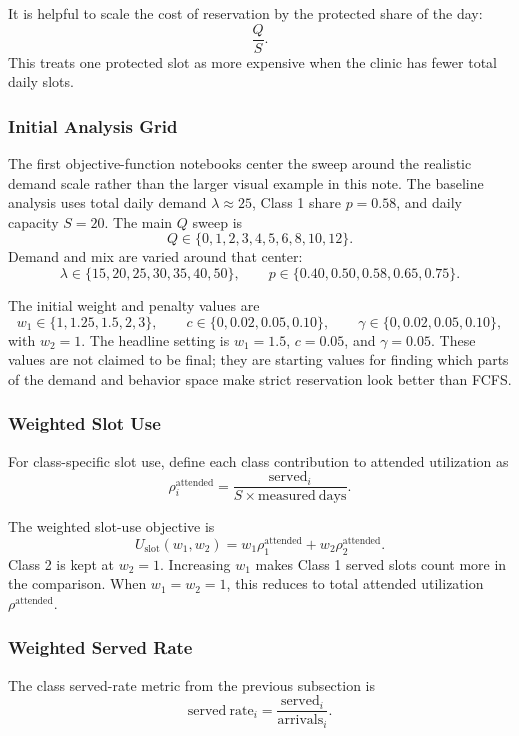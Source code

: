 \documentclass[11pt]{article}
\begin{document}
It is helpful to scale the cost of reservation by the protected share of the day:
\[
\frac{Q}{S}.
\]
This treats one protected slot as more expensive when the clinic has fewer total daily slots.

\subsubsection{Initial Analysis Grid}

The first objective-function notebooks center the sweep around the realistic demand scale rather
than the larger visual example in this note. The baseline analysis uses total daily demand
\(\lambda\approx 25\), Class 1 share \(p=0.58\), and daily capacity \(S=20\). The main \(Q\) sweep is
\[
Q\in\{0,1,2,3,4,5,6,8,10,12\}.
\]
Demand and mix are varied around that center:
\[
\lambda\in\{15,20,25,30,35,40,50\},
\qquad
p\in\{0.40,0.50,0.58,0.65,0.75\}.
\]

The initial weight and penalty values are
\[
w_1\in\{1,1.25,1.5,2,3\},
\qquad
c\in\{0,0.02,0.05,0.10\},
\qquad
\gamma\in\{0,0.02,0.05,0.10\},
\]
with \(w_2=1\). The headline setting is \(w_1=1.5\), \(c=0.05\), and
\(\gamma=0.05\). These values are not claimed to be final; they are starting values for finding
which parts of the demand and behavior space make strict reservation look better than FCFS.

\subsubsection{Weighted Slot Use}

For class-specific slot use, define each class contribution to attended utilization as
\[
\rho_i^{\mathrm{attended}}
=
\frac{\mathrm{served}_i}{S\times\mathrm{measured\ days}}.
\]

The weighted slot-use objective is
\[
U_{\mathrm{slot}}(w_1,w_2)
=
w_1\rho_1^{\mathrm{attended}}
+
w_2\rho_2^{\mathrm{attended}}.
\]
Class 2 is kept at \(w_2=1\). Increasing \(w_1\) makes Class 1 served slots count more in the
comparison. When \(w_1=w_2=1\), this reduces to total attended utilization
\(\rho^{\mathrm{attended}}\).

\subsubsection{Weighted Served Rate}

The class served-rate metric from the previous subsection is
\[
\mathrm{served\ rate}_i
=
\frac{\mathrm{served}_i}{\mathrm{arrivals}_i}.
\]
\end{document}
